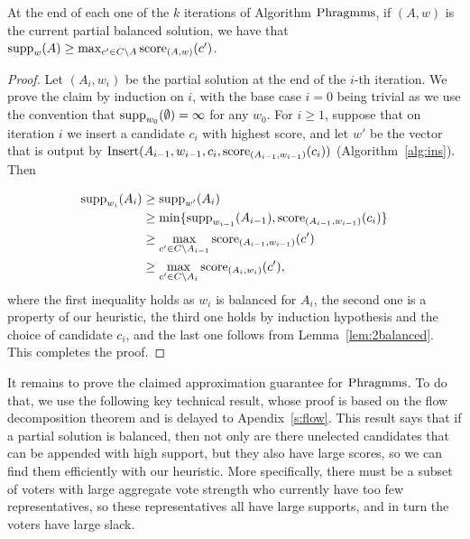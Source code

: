 \begin{lemma}\label{lem:315localoptimality}
At the end of each one of the $k$ iterations of Algorithm $\operatorname{Phragmms}$, if $(A,w)$ is the current partial balanced solution, we have that $\operatorname{supp}_{w}(A)\geq \max_{c'\in C\setminus A} \operatorname{score}_{(A,w)}(c')$.
\end{lemma}
\begin{proof}
Let $(A_i,w_i)$ be the partial solution at the end of the $i$-th iteration. We prove the claim by induction on $i$, with the base case $i=0$ being trivial as we use the convention that $\operatorname{supp}_{w_0}(\emptyset)=\infty$ for any $w_0$. For $i\geq 1$, suppose that on iteration $i$ we insert a candidate $c_i$ with highest score, and let $w'$ be the vector that is output by $\operatorname{Insert}(A_{i-1}, w_{i-1}, c_i, \operatorname{score}_{(A_{i-1}, w_{i-1})}(c_i))$ (Algorithm~\ref{alg:ins}). Then

\begin{align*}
\operatorname{supp}_{w_i}(A_i) &\geq \operatorname{supp}_{w'}(A_i) \\
&\geq \min\{ \operatorname{supp}_{w_{i-1}}(A_{i-1}), \operatorname{score}_{(A_{i-1}, w_{i-1})}(c_i) \} \\
&\geq \max_{c'\in C\setminus A_{i-1}} \operatorname{score}_{(A_{i-1}, w_{i-1})}(c') \\
&\geq \max_{c'\in C\setminus A_{i}} \operatorname{score}_{(A_{i}, w_{i})}(c'), 
\end{align*}
%
where the first inequality holds as $w_i$ is balanced for $A_i$, the second one is a property of our heuristic, the third one holds by induction hypothesis and the choice of candidate $c_i$, and the last one follows from Lemma~\ref{lem:2balanced}. 
This completes the proof.
\end{proof}


It remains to prove the claimed approximation guarantee for $\operatorname{Phragmms}$. 
To do that, we use the following key technical result, whose proof is based on the flow decomposition theorem and is delayed to Apendix~\ref{s:flow}. 
This result says that if a partial solution is balanced, then not only are there unelected candidates that can be appended with high support, but they also have large scores, so we can find them efficiently with our heuristic. 
More specifically, there must be a subset of voters with large aggregate vote strength who currently have too few representatives, so these representatives all have large supports, and in turn the voters have large slack. 

